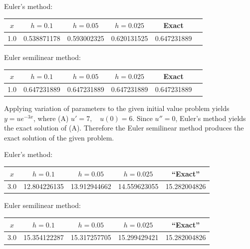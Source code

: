 \bigskip


{\small Euler's method:
\begin{tabular}{|c|r|r|r|r|r|}
\hline
\multicolumn{1}{|c|}{$x$}&
\multicolumn{1}{|c|}{$h=0.1$}&
\multicolumn{1}{|c|}{$h=0.05$}&
\multicolumn{1}{|c|}{$h=0.025$}&
\multicolumn{1}{|c|}{Exact}\\ \hline
1.0 & 0.538871178 & 0.593002325 & 0.620131525 & 0.647231889 \\
\hline
\end{tabular}}

\bigskip

\hspace{.75in}
{\small Euler semilinear method:
\begin{tabular}{|c|r|r|r|r|r|}
\hline
\multicolumn{1}{|c|}{$x$}&
\multicolumn{1}{|c|}{$h=0.1$}&
\multicolumn{1}{|c|}{$h=0.05$}&
\multicolumn{1}{|c|}{$h=0.025$}&
\multicolumn{1}{|c|}{Exact}\\ \hline
1.0 & 0.647231889 & 0.647231889 & 0.647231889 & 0.647231889 \\
\hline
\end{tabular}}

\bigskip

Applying variation of parameters to the given initial value
problem yields $y=ue^{-3x}$, where (A) $u'=7,\quad u(0)=6$. Since
$u''=0$, Euler's method yields the exact solution of (A). Therefore
the Euler semilinear method produces the exact solution of the given
problem.

{\small Euler's method:
\begin{tabular}{|c|r|r|r|r|}
\hline
\multicolumn{1}{|c|}{$x$}&
\multicolumn{1}{|c|}{$h=0.1$}&
\multicolumn{1}{|c|}{$h=0.05$}&
\multicolumn{1}{|c|}{$h=0.025$}&
\multicolumn{1}{|c|}{``Exact''}\\ \hline
3.0 &12.804226135 & 13.912944662 & 14.559623055 & 15.282004826 \\
\hline
\end{tabular}}

\bigskip

\hspace{.75in}
{\small Euler semilinear method:
\begin{tabular}{|c|r|r|r|r|}
\hline
\multicolumn{1}{|c|}{$x$}&
\multicolumn{1}{|c|}{$h=0.1$}&
\multicolumn{1}{|c|}{$h=0.05$}&
\multicolumn{1}{|c|}{$h=0.025$}&
\multicolumn{1}{|c|}{``Exact''}\\ \hline
3.0 & 15.354122287 & 15.317257705 & 15.299429421 & 15.282004826 \\
\hline
\end{tabular}}

